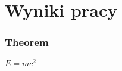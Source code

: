 \section{Wyniki pracy}

\begin{frame}
    \frametitle{Theorem}
    \begin{theorem}
    $E = mc^2$
    \end{theorem}
\end{frame}